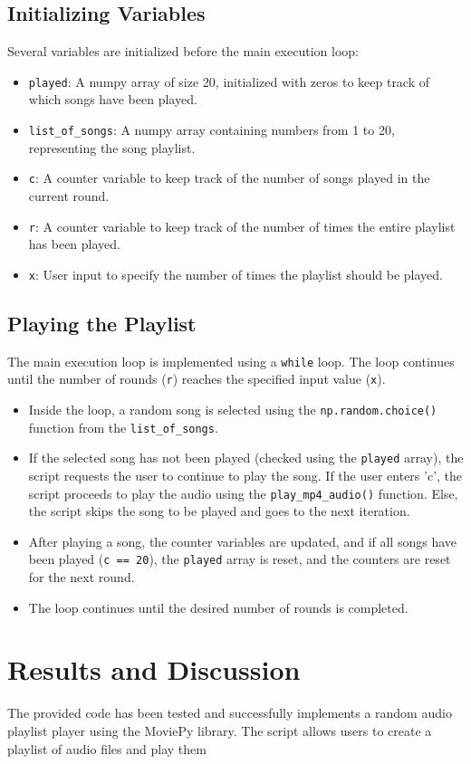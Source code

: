 \documentclass{article}
\begin{document}
\subsection{Initializing Variables}
Several variables are initialized before the main execution loop:
\begin{itemize}
  \item \texttt{played}: A numpy array of size 20, initialized with zeros to keep track of which songs have been played.
  \item \texttt{list\_of\_songs}: A numpy array containing numbers from 1 to 20, representing the song playlist.
  \item \texttt{c}: A counter variable to keep track of the number of songs played in the current round.
  \item \texttt{r}: A counter variable to keep track of the number of times the entire playlist has been played.
  \item \texttt{x}: User input to specify the number of times the playlist should be played.
\end{itemize}

\subsection{Playing the Playlist}
The main execution loop is implemented using a \texttt{while} loop. The loop continues until the number of rounds (\texttt{r}) reaches the specified input value (\texttt{x}).
\begin{itemize}
  \item Inside the loop, a random song is selected using the \texttt{np.random.choice()} function from the \texttt{list\_of\_songs}.
  \item If the selected song has not been played (checked using the \texttt{played} array), the script requests the user to continue to play the song. If the user enters 'c', the script proceeds to play the audio using the \texttt{play\_mp4\_audio()} function. Else, the script skips the song to be played and goes to the next iteration.
  \item After playing a song, the counter variables are updated, and if all songs have been played (\texttt{c == 20}), the \texttt{played} array is reset, and the counters are reset for the next round.
  \item The loop continues until the desired number of rounds is completed.
\end{itemize}

\section{Results and Discussion}
The provided code has been tested and successfully implements a random audio playlist player using the MoviePy library. The script allows users to create a playlist of audio files and play them
\end{document}
